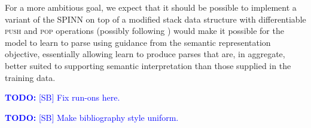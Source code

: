 \documentclass[11pt]{article}
\newcommand\todo[1]{\textcolor{blue}{\textbf{TODO:} #1}}
\begin{document}
For a more ambitious goal, we expect that it should be possible to implement a variant of the SPINN on top of a modified stack data structure with differentiable \textsc{push} and \textsc{pop} operations (possibly following \citet{grefenstette2015learning,joulin2015inferring}) would make it possible for the model to learn to parse using guidance from the semantic representation objective, essentially allowing learn to produce parses that are, in aggregate, better suited to supporting semantic interpretation than those supplied in the training data. 

\todo{[SB] Fix run-ons here.}

%    
 


\todo{[SB] Make bibliography style uniform.}
\end{document}
